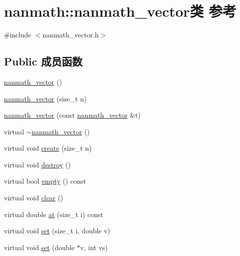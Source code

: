 \hypertarget{classnanmath_1_1nanmath__vector}{}\section{nanmath\+:\+:nanmath\+\_\+vector类 参考}
\label{classnanmath_1_1nanmath__vector}


{\ttfamily \#include $<$nanmath\+\_\+vector.\+h$>$}

\subsection*{Public 成员函数}
\begin{DoxyCompactItemize}
\item 
\hyperlink{classnanmath_1_1nanmath__vector_ac28098c53c4291ce037e15365cfd4b88}{nanmath\+\_\+vector} ()
\item 
\hyperlink{classnanmath_1_1nanmath__vector_a0e16319c50b56097e62694c9f83c5494}{nanmath\+\_\+vector} (size\+\_\+t n)
\item 
\hyperlink{classnanmath_1_1nanmath__vector_afe5d072dfe2201c0fd576fbbb6d1a6d3}{nanmath\+\_\+vector} (const \hyperlink{classnanmath_1_1nanmath__vector}{nanmath\+\_\+vector} \&t)
\item 
virtual \hyperlink{classnanmath_1_1nanmath__vector_abda71a8b607d76e947db2b6f60274e83}{$\sim$nanmath\+\_\+vector} ()
\item 
virtual void \hyperlink{classnanmath_1_1nanmath__vector_af9f7f3a965aee9befe0fff50746848ee}{create} (size\+\_\+t n)
\item 
virtual void \hyperlink{classnanmath_1_1nanmath__vector_a901586a8e1f67af4c1b5c7e5e4126dc0}{destroy} ()
\item 
virtual bool \hyperlink{classnanmath_1_1nanmath__vector_a0af01787ff12d0a2c2564db186061ac3}{empty} () const 
\item 
virtual void \hyperlink{classnanmath_1_1nanmath__vector_a011d39d80690df03197309b2f09105a7}{clear} ()
\item 
virtual double \hyperlink{classnanmath_1_1nanmath__vector_a601939a78266b097d86c2df0ea4504e6}{at} (size\+\_\+t i) const 
\item 
virtual void \hyperlink{classnanmath_1_1nanmath__vector_aa56db6b2a630c59c94b473c459ff4673}{set} (size\+\_\+t i, double v)
\item 
virtual void \hyperlink{classnanmath_1_1nanmath__vector_a331951ae2306cffd3954ccfc2709e68e}{set} (double $\ast$v, int vs)
\item 

\end{DoxyCompactItemize}
